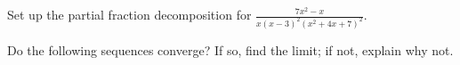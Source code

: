 \documentclass{exam}[12pt]
\begin{document}
\begin{questions}
{

\question[10] Set up the partial fraction decomposition for 
$\displaystyle \frac{7x^2-x}{x(x-3)^2(x^2 +4x + 7)^2}$.
\vspace{.7in}

\pagebreak
\question Do the following sequences converge? If so, find the limit; if not, explain why not.



}
\end{questions}
\end{document}
